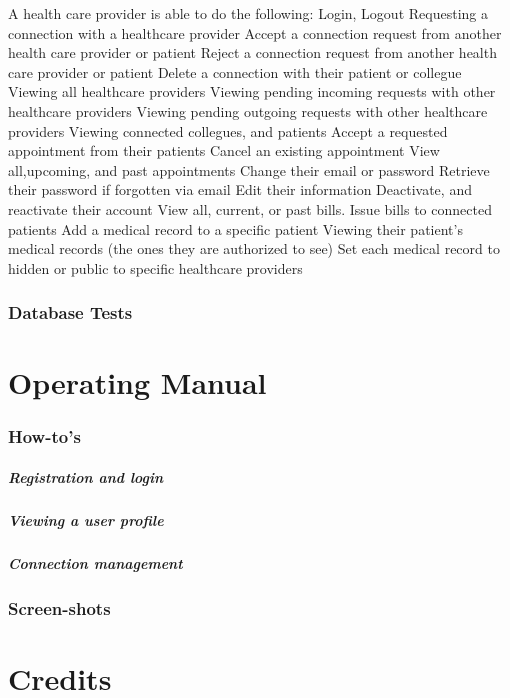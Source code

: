 \documentclass[12pt]{report}
\begin{document}
A health care provider is able to do the following:
\bullet Login, Logout
\bullet Requesting a connection with a healthcare provider
\bullet Accept a connection request from another health care provider or patient
\bullet Reject a connection request from another health care provider or patient
\bullet Delete a connection with their patient or collegue
\bullet Viewing all healthcare providers
\bullet Viewing pending incoming requests with other healthcare providers
\bullet Viewing pending outgoing requests with other healthcare providers
\bullet Viewing connected collegues, and patients
\bullet Accept a requested appointment from their patients
\bullet Cancel an existing appointment
\bullet View all,upcoming, and past appointments
\bullet Change their email or password
\bullet Retrieve their password if forgotten via email
\bullet Edit their information
\bullet Deactivate, and reactivate their account
\bullet View all, current, or past bills.
\bullet Issue bills to connected patients
\bullet Add a medical record to a specific patient
\bullet Viewing their patient's medical records (the ones they are authorized to see)
\bullet Set each medical record to hidden or public to specific healthcare providers

\subsection{Database Tests}

\chapter{Operating Manual}
\subsection{How-to's}
\paragraph{Registration and login}
\paragraph{Viewing a user profile}
\paragraph{Connection management}

\subsection{Screen-shots}

\chapter{Credits}
\end{document}
